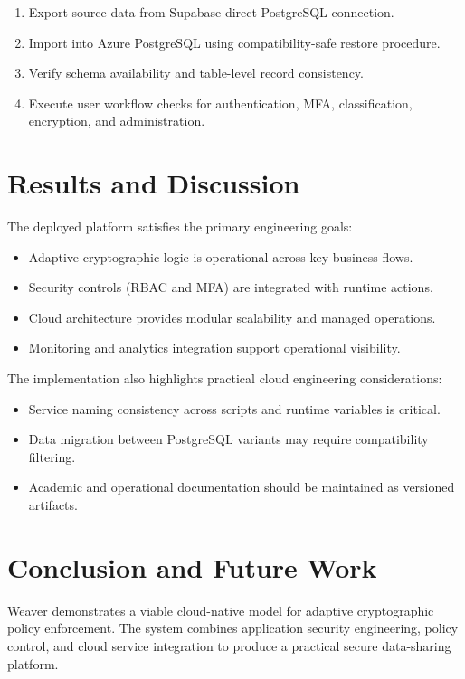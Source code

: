 \documentclass[12pt,a4paper]{article}
\begin{document}
\begin{enumerate}[leftmargin=1.4em]
  \item Export source data from Supabase direct PostgreSQL connection.
  \item Import into Azure PostgreSQL using compatibility-safe restore procedure.
  \item Verify schema availability and table-level record consistency.
  \item Execute user workflow checks for authentication, MFA, classification, encryption, and administration.
\end{enumerate}

\section{Results and Discussion}

The deployed platform satisfies the primary engineering goals:

\begin{itemize}[leftmargin=1.4em]
  \item Adaptive cryptographic logic is operational across key business flows.
  \item Security controls (RBAC and MFA) are integrated with runtime actions.
  \item Cloud architecture provides modular scalability and managed operations.
  \item Monitoring and analytics integration support operational visibility.
\end{itemize}

The implementation also highlights practical cloud engineering considerations:

\begin{itemize}[leftmargin=1.4em]
  \item Service naming consistency across scripts and runtime variables is critical.
  \item Data migration between PostgreSQL variants may require compatibility filtering.
  \item Academic and operational documentation should be maintained as versioned artifacts.
\end{itemize}

\section{Conclusion and Future Work}

Weaver demonstrates a viable cloud-native model for adaptive cryptographic policy enforcement. The system combines application security engineering, policy control, and cloud service integration to produce a practical secure data-sharing platform.
\end{document}
